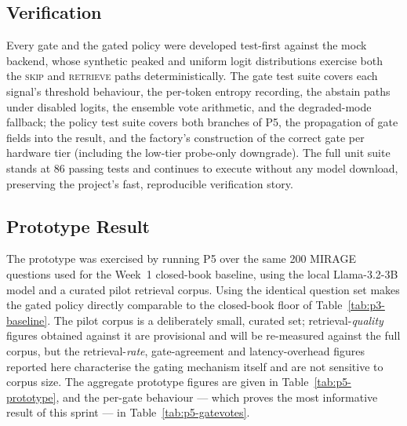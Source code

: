 \subsection{Verification}
\label{sec:gate-verification}

Every gate and the gated policy were developed test-first against the mock
backend, whose synthetic peaked and uniform logit distributions exercise both
the \textsc{skip} and \textsc{retrieve} paths deterministically. The gate test
suite covers each signal's threshold behaviour, the per-token entropy
recording, the abstain paths under disabled logits, the ensemble vote
arithmetic, and the degraded-mode fallback; the policy test suite covers both
branches of P5, the propagation of gate fields into the result, and the
factory's construction of the correct gate per hardware tier (including the
low-tier probe-only downgrade). The full unit suite stands at 86 passing tests
and continues to execute without any model download, preserving the project's
fast, reproducible verification story.

\subsection{Prototype Result}
\label{sec:p5-prototype}

The prototype was exercised by running P5 over the same 200 MIRAGE questions
used for the Week~1 closed-book baseline, using the local Llama-3.2-3B model
and a curated pilot retrieval corpus. Using the identical question set makes the
gated policy directly comparable to the closed-book floor of
Table~\ref{tab:p3-baseline}. The pilot corpus is a deliberately small,
curated set; retrieval-\emph{quality} figures obtained against it are
provisional and will be re-measured against the full corpus, but the
retrieval-\emph{rate}, gate-agreement and latency-overhead figures reported
here characterise the gating mechanism itself and are not sensitive to corpus
size. The aggregate prototype figures are given in
Table~\ref{tab:p5-prototype}, and the per-gate behaviour --- which proves the
most informative result of this sprint --- in Table~\ref{tab:p5-gatevotes}.

